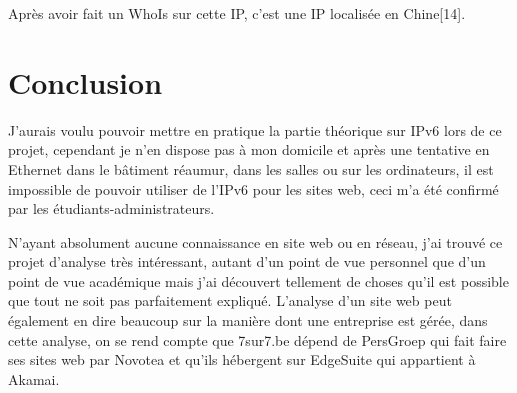 \documentclass[conference]{IEEEtran}
\begin{document}
Après avoir fait un WhoIs sur cette IP, c'est une IP localisée en Chine[14].

\section{Conclusion}

J'aurais voulu pouvoir mettre en pratique la partie théorique sur IPv6 lors de ce projet, cependant je n'en dispose pas à mon domicile et après une tentative en Ethernet dans le bâtiment réaumur, dans les salles ou sur les ordinateurs, il est impossible de pouvoir utiliser de l'IPv6 pour les sites web, ceci m'a été confirmé par les étudiants-administrateurs. 

N'ayant absolument aucune connaissance en site web ou en réseau, j'ai trouvé ce projet d'analyse très intéressant, autant d'un point de vue personnel que d'un point de vue académique mais j'ai découvert tellement de choses qu'il est possible que tout ne soit pas parfaitement expliqué. L'analyse d'un site web peut également en dire beaucoup sur la manière dont une entreprise est gérée, dans cette analyse, on se rend compte que 7sur7.be dépend de PersGroep qui fait faire ses sites web par Novotea et qu'ils hébergent sur EdgeSuite qui appartient à Akamai.
\end{document}
